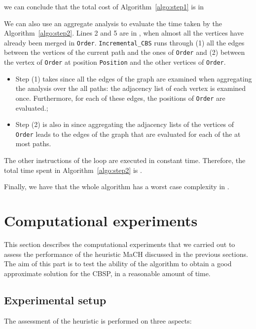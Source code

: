 \documentclass{scrartcl}
\theoremstyle{plain}
\newcommand{\algo}{MaCH}
\newcommand{\cbsp}{CBSP}
\begin{document}
we can conclude that the total cost of Algorithm~\ref{algo:step1} is in 


We can also use an aggregate analysis to evaluate the time taken by the 
Algorithm~\ref{algo:step2}. Lines 2 and 5 are in , when almost all the 
vertices have already been merged in \texttt{Order}. \texttt{Incremental\_CBS} 
runs through (1) all the edges between the vertices of the current path  and 
the ones of \texttt{Order} and (2) between the vertex of \texttt{Order} at 
position \texttt{Position} and the other vertices of \texttt{Order}.
\begin{itemize} 
	\item Step (1) takes  since all the edges of the graph are examined 
when aggregating the analysis over the all paths: the adjacency list of each 
vertex is examined once. Furthermore, for each of these  edges, the  
positions of \texttt{Order} are evaluated.;
	\item Step (2) is also in  since aggregating the adjacency lists of 
the vertices of \texttt{Order} leads to the  edges of the graph that are 
evaluated for each of the at most  paths. \end{itemize}
The other 
instructions of the loop are executed in constant time. Therefore, the total 
time spent in Algorithm~\ref{algo:step2} is . 

Finally, we have that the whole algorithm has a worst case complexity in 
.
 
\makeatletter{}\section{Computational experiments}
\label{sec:results}

This section describes the computational experiments that we carried out to 
assess the performance of the heuristic \algo{} discussed in the previous 
sections. The aim of this part is to test the ability of the algorithm to obtain 
a good approximate solution for the \cbsp{}, in a reasonable amount of time. 

\subsection{Experimental setup}
\label{subsec:setup}

The assessment of the heuristic is performed on three aspects:
\end{document}
